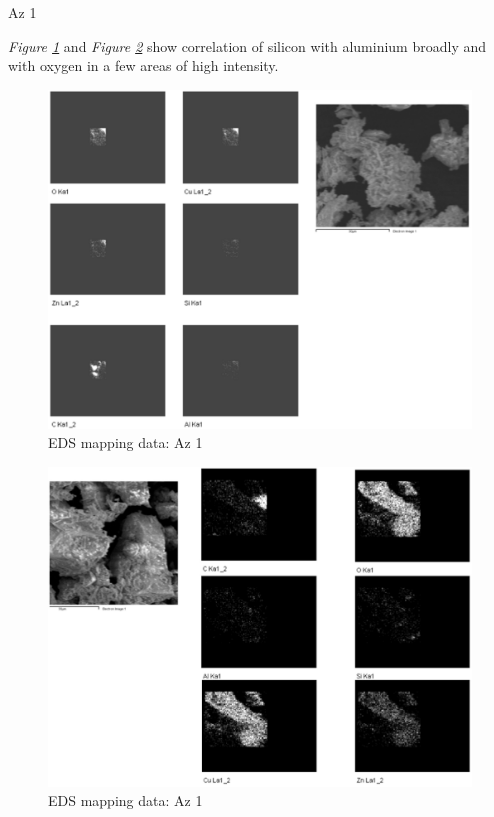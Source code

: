 Az 1

\textit{Figure \ref{fig:az1_map2}} and \textit{Figure \ref{fig:az1_map3}} show correlation of silicon with aluminium broadly and with oxygen in a few areas of high intensity.

\begin{figure}[H]
\centering
  \includegraphics[width=0.9\linewidth]{Az1_EDS_map1_250221_imgs}
\caption[EDS mapping data: Az 1]{EDS mapping data: Az 1}
\label{fig:az1_map2}
\end{figure}

\begin{figure}[H]
\centering
  \includegraphics[width=0.9\linewidth]{Az1_EDS_map3_250221_imgs}
\caption[EDS mapping data: Az 1]{EDS mapping data: Az 1}
\label{fig:az1_map3}
\end{figure}

